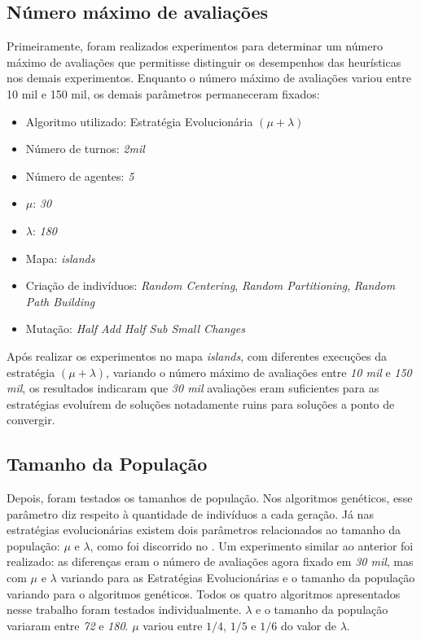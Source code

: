 \subsection{Número máximo de avaliações}

Primeiramente, foram realizados experimentos para determinar um número máximo 
de avaliações que permitisse distinguir os desempenhos das heurísticas nos 
demais experimentos. Enquanto o número máximo de avaliações variou entre 10 mil 
e 150 mil, os demais parâmetros permaneceram fixados:

\begin{itemize}
	\item Algoritmo utilizado: Estratégia Evolucionária $(\mu + \lambda)$
	\item Número de turnos: \textit{2mil}
	\item Número de agentes: \textit{5}
	\item $\mu$: \textit{30}
	\item $\lambda$: \textit{180}
	\item Mapa: \textit{islands}
	\item Criação de indivíduos: \textit{Random Centering}, 
	\textit{Random Partitioning}, \textit{Random Path Building}
	\item Mutação: \textit{Half Add Half Sub Small Changes}
\end{itemize}

Após realizar os experimentos no mapa \textit{islands}, com diferentes execuções 
da estratégia $(\mu + \lambda)$, variando o número máximo de avaliações entre 
\textit{10 mil} e \textit{150 mil}, os resultados indicaram que \textit{30 mil} 
avaliações eram suficientes para as estratégias evoluírem de soluções 
notadamente ruins para soluções a ponto de convergir.

\subsection{Tamanho da População}

Depois, foram testados os tamanhos de população. Nos algoritmos genéticos, 
esse parâmetro diz respeito à quantidade de indivíduos a cada geração. 
Já nas estratégias evolucionárias existem dois parâmetros relacionados ao 
tamanho da população: $\mu$ e $\lambda$, como foi discorrido no 
. Um experimento similar ao anterior foi realizado: as 
diferenças eram o número de avaliações agora fixado em \textit{30 mil}, mas com 
$\mu$ e $\lambda$ variando para as Estratégias Evolucionárias e o tamanho da 
população variando para o algoritmos genéticos. Todos os quatro algoritmos 
apresentados nesse trabalho foram testados individualmente. $\lambda$ e o 
tamanho da população variaram entre \textit{72} e \textit{180}. $\mu$ variou 
entre $1/4$, $1/5$ e $1/6$ do valor de $\lambda$.


